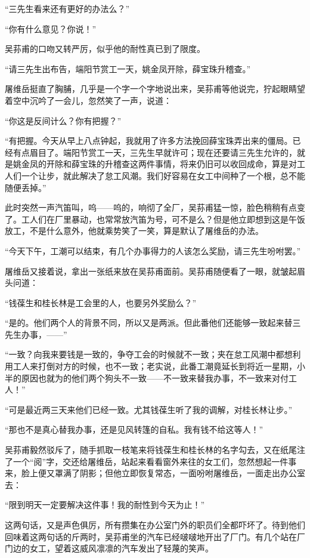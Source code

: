 \par “三先生看来还有更好的办法么？”
\par “你有什么意见？你说！”
\par 吴荪甫的口吻又转严厉，似乎他的耐性真已到了限度。
\par “请三先生出布告，端阳节赏工一天，姚金凤开除，薛宝珠升稽查。”
\par 屠维岳挺直了胸脯，几乎是一个字一个字地说出来，吴荪甫等他说完，狞起眼睛望着空中沉吟了一会儿，忽然笑了一声，说道：
\par “你这是反间计么？你有把握？”
\par “有把握。今天从早上八点钟起，我就用了许多方法挽回薛宝珠弄出来的僵局。已经有点眉目了。端阳节赏工一天，三先生早就许可；现在还要请三先生允许的，就是姚金凤的开除和薛宝珠的升稽查这两件事情，将来仍旧可以收回成命，算是对工人们一个让步，就此解决了怠工风潮。我们好容易在女工中间种了一个根，总不能随便丢掉。”
\par 此时突然一声汽笛叫，呜——呜的，响彻了全厂，吴荪甫猛一惊，脸色稍稍有点变了。工人们在厂里暴动，也常常放汽笛为号，可不是么？但是他立即想到这是午饭放工，不是什么意外，他就乘势笑了一笑，算是默认了屠维岳的办法。
\par “今天下午，工潮可以结束，有几个办事得力的人该怎么奖励，请三先生吩咐罢。”
\par 屠维岳又接着说，拿出一张纸来放在吴荪甫面前。吴荪甫随便看了一眼，就皱起眉头问道：
\par “钱葆生和桂长林是工会里的人，也要另外奖励么？”
\par “是的。他们两个人的背景不同，所以又是两派。但此番他们还能够一致起来替三先生办事，——”
\par “一致？向我来要钱是一致的，争夺工会的时候就不一致；夹在怠工风潮中都想利用工人来打倒对方的时候，也不一致；老实说，此番工潮竟延长到将近一星期，小半的原因也就为的他们两个狗头不一致——不一致来替我办事，不一致来对付工人！”
\par “可是最近两三天来他们已经一致。尤其钱葆生听了我的调解，对桂长林让步。”
\par “那也不是真心替我办事，还是见风转篷的自私。我有钱不给这等人！”
\par 吴荪甫毅然驳斥了，随手抓取一枝笔来将钱葆生和桂长林的名字勾去，又在纸尾注了一个“阅”字，交还给屠维岳，站起来看看窗外来往的女工们，忽然想起一件事来，脸上便又罩满了阴影；但他立即恢复常态，一面吩咐屠维岳，一面走出办公室去：
\par “限到明天一定要解决这件事！我的耐性到今天为止！”
\par 这两句话，又是声色俱厉，所有攒集在办公室门外的职员们全都吓坏了。待到他们回味着这两句话的斤两时，吴荪甫坐的汽车已经啵啵地开出了厂门。有几个站在厂门边的女工，望着这威风凛凛的汽车发出了轻蔑的笑声。
